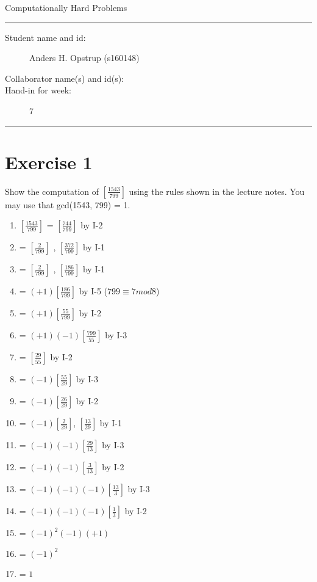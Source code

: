\documentclass[11pt]{article}
\begin{document}
\begin{center}
{{\Large \sc Computationally Hard Problems}}
\end{center}
\rule{\textwidth}{1pt}
\begin{description}
\item[Student name and id:] Anders H. Opstrup (s160148)
\item[Collaborator name(s) and id(s):]
\item[Hand-in for week:] 7
\end{description}
\rule{\textwidth}{1pt}


\section*{Exercise 1}

Show the computation of $[\frac{1543}{799}]$ using the rules shown in the lecture notes. You may use that gcd(1543, 799) = 1.

\begin{enumerate}
	\item $[\frac{1543}{799}]$ = $[\frac{744}{799}]$				by I-2
	\item = $[\frac{2}{799}]$ , $[\frac{372}{799}]$ 					by I-1
	\item = $[\frac{2}{799}]$ , $[\frac{186}{799}]$ 					by I-1
	\item = $(+1) [\frac{186}{799}]$ 											by I-5 ($799 \equiv 7 mod 8$)
	\item = $(+1) [\frac{55}{799}]$												by I-2
	\item = $(+1)(-1) [\frac{799}{55}]$											by I-3
	\item = $[\frac{29}{55}]$															by I-2
	\item = $(-1) [\frac{55}{29}]$													by I-3
	\item = $(-1) [\frac{26}{29}]$													by I-2
	\item = $(-1)[\frac{2}{29}]$, $[\frac{13}{29}]$						by I-1
	\item = $(-1)(-1)[\frac{29}{13}]$												by I-3
	\item = $(-1)(-1)[\frac{3}{13}]$												by I-2
	\item = $(-1)(-1)(-1)[\frac{13}{3}]$											by I-3
	\item = $(-1)(-1)(-1)[\frac{1}{3}]$											by I-2
	\item = $(-1)^{2}(-1)(+1)$
	\item = $(-1)^{2}$
	\item = $1$
\end{enumerate}
\end{document}

